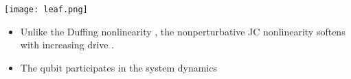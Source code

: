 \documentclass{beamer}
\begin{document}
\begin{frame}
    \begin{center}
        \texttt{[image: leaf.png]}
    \end{center}
    \begin{itemize}
        \item Unlike the Duffing nonlinearity 
            ,
            the nonperturbative JC nonlinearity softens with 
            increasing drive
            .
        \item The qubit participates in the system dynamics
    \end{itemize}
\end{frame}
\begin{frame}
    
\end{frame}
\begin{frame}
    \printbibliography\
\end{frame}
\end{document}
